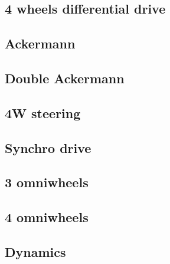 \subsection{4 wheels differential drive}






\subsection{Ackermann}

\subsection{Double Ackermann}

\subsection{4W steering}

\subsection{Synchro drive}

\subsection{3 omniwheels}

\subsection{4 omniwheels}


\subsection{Dynamics}


